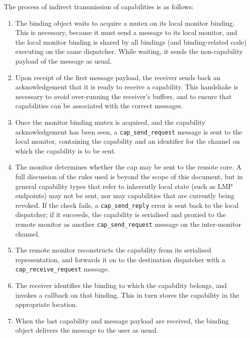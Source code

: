 \documentclass[a4paper,twoside]{report} %
\begin{document}
The process of indirect transmission of capabilities is as follows:
\begin{enumerate}
 \item The binding object waits to acquire a mutex on its local monitor binding.
     This is necessary, because it must send a message to its local monitor, and
     the local monitor binding is shared by all bindings (and binding-related
     code) executing on the same dispatcher. While waiting, it sends the
     non-capability payload of the message as usual.

  \item Upon receipt of the first message payload, the receiver sends back an
     acknowledgement that it is ready to receive a capability. This handshake
     is necessary to avoid over-running the receiver's buffers, and to ensure
     that capabilities can be associated with the correct messages.

  \item Once the monitor binding mutex is acquired, and the capability
     acknowledgement has been seen, a \lstinline+cap_send_request+ message
     is sent to the local monitor, containing the capability and an identifier
     for the channel on which the capability is to be sent.

  \item The monitor determines whether the cap may be sent to the remote core.
    A full discussion of the rules used is beyond the scope of this document,
    but in general capability types that refer to inherently local state (such
    as LMP endpoints) may not be sent, nor may capabilities that are currently
    being revoked. If the check fails, a \lstinline+cap_send_reply+ error is
    sent back to the local dispatcher; if it succeeds, the capability is
    serialised and proxied to the remote monitor as another
    \lstinline+cap_send_request+ message on the inter-monitor channel.

  \item The remote monitor reconstructs the capability from its serialised
    representation, and forwards it on to the destination dispatcher with a
    \lstinline+cap_receive_request+ message.

  \item The receiver identifies the binding to which the capability belongs,
    and invokes a callback on that binding. This in turn stores the capability
    in the appropriate location.

  \item When the last capability and message payload are received, the binding
   object delivers the message to the user as usual.
\end{enumerate}
\end{document}

